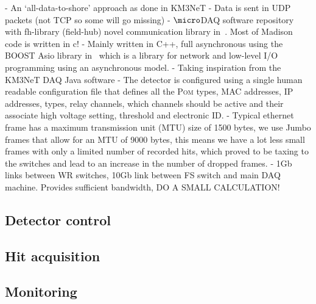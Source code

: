 - An `all-data-to-shore' approach as done in KM3NeT
- Data is sent in UDP packets (not TCP so some will go missing)
- $\micro$DAQ software repository with fh-library (field-hub) novel communication library
in~\cite{microdaq2020}. Most of Madison code is written in c!
- Mainly written in C++, full asynchronous using the BOOST Asio library in~\cite{boost2020} which
is a library for network and low-level I/O programming using an asynchronous model.
- Taking inspiration from the KM3NeT DAQ Java software
- The detector is configured using a single human readable configuration file that defines all the
\textsc{Pom} types, MAC addresses, IP addresses, types, relay channels, which channels should be active and
their associate high voltage setting, threshold and electronic ID.
- Typical ethernet frame has a maximum transmission unit (MTU) size of 1500 bytes, we use Jumbo
frames that allow for an MTU of 9000 bytes, this means we have a lot less small frames with only a
limited number of recorded hits, which proved to be taxing to the switches and lead to an increase
in the number of dropped frames.
- 1Gb links between WR switches, 10Gb link between FS switch and main DAQ machine. Provides
sufficient bandwidth, DO A SMALL CALCULATION!

\subsection{Detector control} %
\label{sec:daq_soft_control} %

\subsection{Hit acquisition} %
\label{sec:daq_soft_hits} %

\subsection{Monitoring} %
\label{sec:daq_soft_monitor} %

